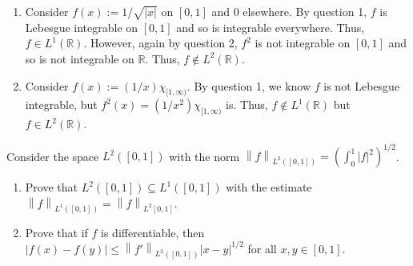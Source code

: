\documentclass[12pt]{article}
\newcommand{\norm}[1]{\left\lVert#1\right\rVert}
\newenvironment{solution}[2][Solution]{\begin{trivlist}
\item[\hskip \labelsep {\bfseries #1}]}{\end{trivlist}}
\newenvironment{problem}[2][Problem]{\begin{trivlist}
\item[\hskip \labelsep {\bfseries #1}\hskip \labelsep {\bfseries #2.}]}{\end{trivlist}}
\begin{document}
\begin{solution}{}
	\begin{enumerate}
		\item[(i.)] Consider $f(x) := 1/\sqrt{|x|}$ on $[0,1]$ and 0 elsewhere. By question 1, $f$ is Lebesgue integrable on $[0,1]$ and so is integrable everywhere. 
		Thus, $f\in L^1(\mathbb{R})$. However, again by question 2, $f^2$ is not integrable on $[0,1]$ and so is not integrable on $\mathbb{R}$. Thus, $f\not\in L^2(\mathbb{R})$.
		\item[(ii.)] Consider $f(x) := (1/x)\chi_{[1,\infty)}$. By question 1, we know $f$ is not Lebesgue integrable, but $f^2(x) = (1/x^2)\chi_{[1,\infty)}$ is. Thus,
		$f\not\in L^1(\mathbb{R})$ but $f\in L^2(\mathbb{R})$.
	\end{enumerate}
\end{solution}

\begin{problem}{7}
    Consider the space $L^2([0,1])$ with the norm $\norm{f}_{L^2([0,1])} = (\int_0^1 |f|^2)^{1/2}$.
    \begin{enumerate}
        \item Prove that $L^2([0,1])\subseteq L^1([0,1])$ with the estimate $\norm{f}_{L^1([0,1])} = \norm{f}_{L^2[0,1]}$.
        \item Prove that if $f$ is differentiable, then $|f(x)-f(y)|\leq\norm{f'}_{L^2([0,1])}|x-y|^{1/2}$ for all $x,y\in[0,1]$.
    \end{enumerate}
\end{problem}
\end{document}
